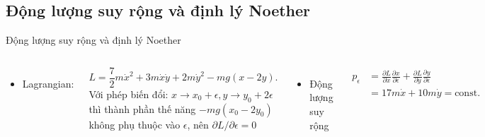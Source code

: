 \subsection{Động lượng suy rộng và định lý Noether}

\begin{frame}{Động lượng suy rộng và định lý Noether}
\vspace{-4mm}
\begin{columns}
    \begin{itemize}
        \item Lagrangian:
    \end{itemize}
    \begin{equation}
        L = \frac{7}{2} m \dot{x}^2 + 3 m \dot{x} \dot{y} + 2 m \dot{y}^2 - mg (x-2y). 
    \end{equation}
    Với phép biến đổi: \(x \to x_0 + \epsilon, y \to y_0 + 2\epsilon\) thì thành phần thế năng \(-mg (x_0 - 2 y_0)\) không phụ thuộc vào \(\epsilon\), nên \(\partial L / \partial \epsilon = 0\)

    \begin{itemize}
        \item Động lượng suy rộng
    \end{itemize}
    \begin{equation}
    \begin{split}
        p_{\epsilon} &= \frac{\partial L}{\partial \dot{x}} \frac{\partial x}{\partial \epsilon} + \frac{\partial L}{\partial \dot{y}} \frac{\partial y}{\partial \epsilon} \\
        &= 17 m \dot{x} + 10 m \dot{y} = \text{const}.
    \end{split}
    \end{equation}

    \begin{figure}
        \centering
        \includegraphics[width=0.9\linewidth]{Figures/Atwoods_machine.pdf}
        \caption{Hệ thống ròng rọc có động lượng suy rộng bảo toàn.}
        \label{fig:Atwoods_machine}
    \end{figure}
    
\end{columns}
\end{frame}

